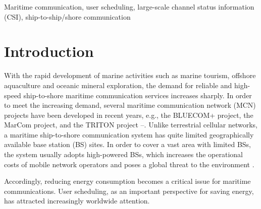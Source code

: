 \documentclass[conference]{IEEEtran}
\begin{document}
\begin{IEEEkeywords}
Maritime communication, user scheduling, large-scale channel status information (CSI), ship-to-ship/shore communication
\end{IEEEkeywords}


\maketitle

\section{Introduction}\label{sec:1}
With the rapid development of marine activities such as marine tourism, offshore aquaculture and oceanic mineral exploration, the demand for reliable and high-speed ship-to-shore maritime communication services increases sharply. In order to meet the increasing demand, several maritime communication network (MCN) projects have been developed in recent years, e.g., the BLUECOM+ project, the MarCom project, and the TRITON project \cite{p321}--\cite{p32}.
Unlike terrestrial cellular networks, a maritime ship-to-shore communication system has quite limited geographically available base station (BS) sites. In order to cover a vast area with limited BSs, the system usually adopts high-powered BSs, which increases the operational costs of mobile network operators and poses a global threat to the environment \cite{p33}.

Accordingly, reducing energy consumption becomes a critical issue for maritime communications. User scheduling, as an important perspective for saving energy, has attracted increasingly worldwide attention. 

\end{document}
